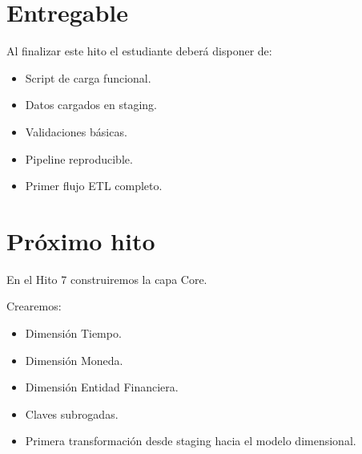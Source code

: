 \section{Entregable}

Al finalizar este hito el estudiante deberá disponer de:

\begin{itemize}
\item Script de carga funcional.
\item Datos cargados en staging.
\item Validaciones básicas.
\item Pipeline reproducible.
\item Primer flujo ETL completo.
\end{itemize}

\section{Próximo hito}

En el Hito 7 construiremos la capa Core.

Crearemos:

\begin{itemize}
\item Dimensión Tiempo.
\item Dimensión Moneda.
\item Dimensión Entidad Financiera.
\item Claves subrogadas.
\item Primera transformación desde staging hacia el modelo dimensional.
\end{itemize}
